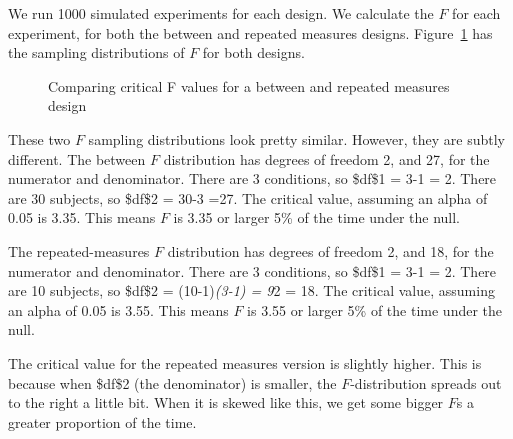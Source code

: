 \documentclass[
  letterpaper,
  DIV=11,
  numbers=noendperiod]{scrreprt}
\begin{document}
We run 1000 simulated experiments for each design. We calculate the
\(F\) for each experiment, for both the between and repeated measures
designs. Figure~\ref{fig-9critcompare} has the sampling distributions of
\(F\) for both designs.

\begin{figure}


\caption{\label{fig-9critcompare}Comparing critical F values for a
between and repeated measures design}

\end{figure}%

These two \(F\) sampling distributions look pretty similar. However,
they are subtly different. The between \(F\) distribution has degrees of
freedom 2, and 27, for the numerator and denominator. There are 3
conditions, so \$df\$1 = 3-1 = 2. There are 30 subjects, so \$df\$2 =
30-3 =27. The critical value, assuming an alpha of 0.05 is 3.35. This
means \(F\) is 3.35 or larger 5\% of the time under the null.

The repeated-measures \(F\) distribution has degrees of freedom 2, and
18, for the numerator and denominator. There are 3 conditions, so
\$df\$1 = 3-1 = 2. There are 10 subjects, so \$df\$2 = (10-1)\emph{(3-1)
= 9}2 = 18. The critical value, assuming an alpha of 0.05 is 3.55. This
means \(F\) is 3.55 or larger 5\% of the time under the null.

The critical value for the repeated measures version is slightly higher.
This is because when \$df\$2 (the denominator) is smaller, the
\(F\)-distribution spreads out to the right a little bit. When it is
skewed like this, we get some bigger \(F\)s a greater proportion of the
time.
\end{document}
